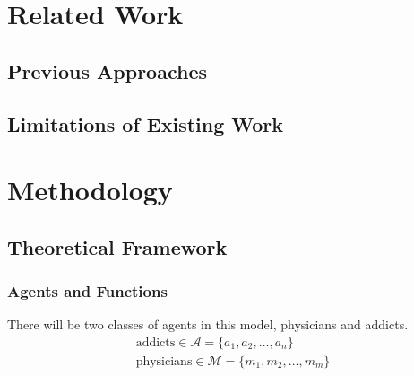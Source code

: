 \documentclass[11pt,a4paper]{article}
\begin{document}

\section{Related Work}
\label{sec:related_work}


\subsection{Previous Approaches}
\label{subsec:previous_approaches}


\subsection{Limitations of Existing Work}
\label{subsec:limitations}


\section{Methodology}
\label{sec:methodology}

\subsection{Theoretical Framework}
\label{subsec:framework}

\subsubsection{Agents and Functions}
\label{subsubsec:agents&functions}
There will be two classes of agents in this model, physicians and addicts. 
\begin{gather*}
  \text{addicts} \in \mathcal{A} = \{a_1, a_2, \ldots, a_n\} \\
  \text{physicians} \in \mathcal{M} = \{m_1, m_2, \ldots, m_m\}
\end{gather*}
\end{document}
